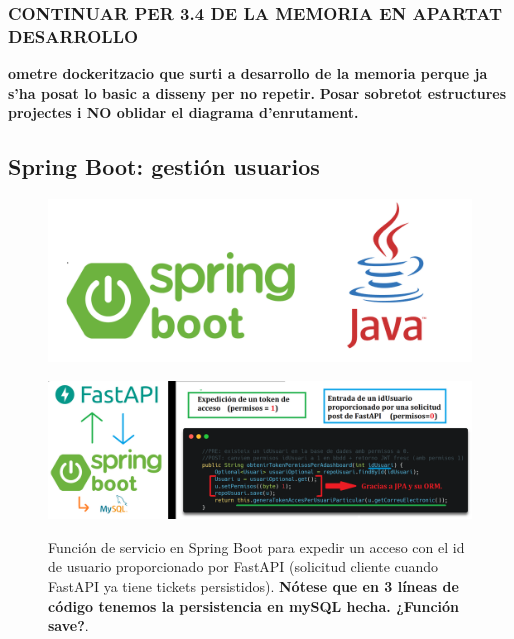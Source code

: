 \documentclass{beamer}
\begin{document}
	
	
	
	\begin{frame}
		\frametitle{CONTINUAR PER 3.4 DE LA MEMORIA EN APARTAT DESARROLLO}
		\textbf{ometre dockeritzacio que surti a desarrollo de la memoria perque ja s'ha posat lo basic a disseny per no repetir.}
		\textbf{Posar sobretot estructures projectes i NO oblidar el diagrama d'enrutament.}
	\end{frame}
	
	
	
	
	\subsection{Spring Boot: gestión usuarios}
	
	
	
	\begin{frame}
		
		
		\begin{figure}
			\centering
			\includegraphics[width=1\linewidth]{imgEspecifiques/springBootLogoPART}
			
			\label{fig:springbootlogopart}
		\end{figure}
		
	\end{frame}
	
	
	\begin{frame}
		\begin{figure}
			\centering
			\includegraphics[width=1\linewidth]{imgEspecifiques/diaposolicitudTokenAccesFastAPI.png}
			\label{fig:diaposolicitudTokenAccesFastAPI}
			\caption{Función de servicio en Spring Boot para expedir un acceso con el id de usuario proporcionado por FastAPI (solicitud cliente cuando FastAPI ya tiene tickets persistidos). \textbf{Nótese que en 3 líneas de código tenemos la persistencia en mySQL hecha. ¿Función save?}.}
		\end{figure}
	\end{frame}
		
\end{document}
